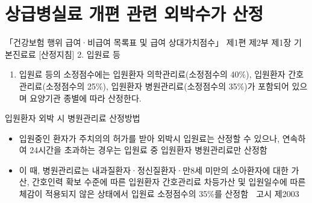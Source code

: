 ﻿\section{상급병실료 개편 관련 외박수가 산정}

\begin{commentbox}{「건강보험 행위 급여·비급여 목록표 및 급여 상대가치점수」
제1편 제2부 제1장 기본진료료 [산정지침] 2. 입원료 등}
\begin{enumerate}[가.]\tightlist
\item 입원료 등의 소정점수에는 입원환자 의학관리료(소정점수의 40\%), 입원환자 간호관리료(소정점수의 25\%), 입원환자 병원관리료(소정점수의 35\%)가 포함되어 있으며 요양기관 종별에 따라 산정한다.
\end{enumerate}
\end{commentbox}

\begin{commentbox}{입원환자 외박 시 병원관리료 산정방법}
\begin{itemize}\tightlist
\item 입원중인 환자가 주치의의 허가를 받아 외박시 입원료는 산정할 수 있으나, 연속하여 24시간을 초과하는 경우는 입원료 중 입원환자 병원관리료만 산정함
\item 이 때, 병원관리료는 내과질환자·정신질환자·만8세 미만의 소아환자에 대한 가산, 간호인력 확보 수준에 따른 입원환자 간호관리료 차등가산 및 입원일수에 따른 체감이 적용되지 않은 상태에서 입원료 소정점수의 35\%를 산정함
 고시 제2003
\end{itemize}
\end{commentbox}

